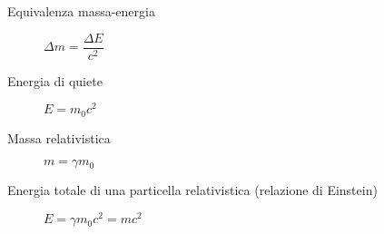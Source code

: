 \documentclass[a4paper,11pt,italian]{article}
\begin{document}
\begin{description}
   \item[Equivalenza massa-energia] %
  $ \Delta m = \dfrac{\Delta E}{c^2} $
  
  \item[Energia di quiete]%
  $ E = m_0 c^2 $
  
  \item[Massa relativistica]
  $ m = \gamma m_0 $
  
  \item[Energia totale di una particella relativistica (relazione di Einstein)]
  $ E = \gamma m_0 c^2 = mc^2$
  
  
%
%
%
  
%   
\end{description}
\end{document}
